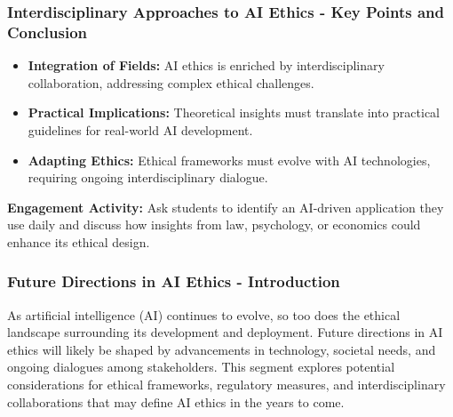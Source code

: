 \documentclass[aspectratio=169]{beamer}
\begin{document}
\begin{frame}[fragile]
  \frametitle{Interdisciplinary Approaches to AI Ethics - Key Points and Conclusion}
  \begin{itemize}
    \item \textbf{Integration of Fields:} AI ethics is enriched by interdisciplinary collaboration, addressing complex ethical challenges.
    \item \textbf{Practical Implications:} Theoretical insights must translate into practical guidelines for real-world AI development.
    \item \textbf{Adapting Ethics:} Ethical frameworks must evolve with AI technologies, requiring ongoing interdisciplinary dialogue.
  \end{itemize}
  \textbf{Engagement Activity:} Ask students to identify an AI-driven application they use daily and discuss how insights from law, psychology, or economics could enhance its ethical design.
\end{frame}

\begin{frame}[fragile]
    \frametitle{Future Directions in AI Ethics - Introduction}
    As artificial intelligence (AI) continues to evolve, so too does the ethical landscape surrounding its development and deployment. Future directions in AI ethics will likely be shaped by advancements in technology, societal needs, and ongoing dialogues among stakeholders. This segment explores potential considerations for ethical frameworks, regulatory measures, and interdisciplinary collaborations that may define AI ethics in the years to come.
\end{frame}
\end{document}

